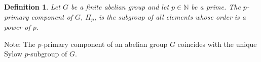 \documentclass[12pt]{article}
\newtheorem{defn}{Definition}
\newcommand{\Nats}{\mathbb{N}}
\begin{document}
\begin{defn}
Let $G$ be a finite abelian group and let $p\in \Nats$ be a prime.
The \emph{$p$-primary component} of $G$, $\Pi_p$, is the subgroup
of all elements whose order is a power of $p$.
\end{defn}

Note: The $p$-primary component of an abelian group $G$ coincides
with the unique Sylow $p$-subgroup of $G$.
\end{document}
